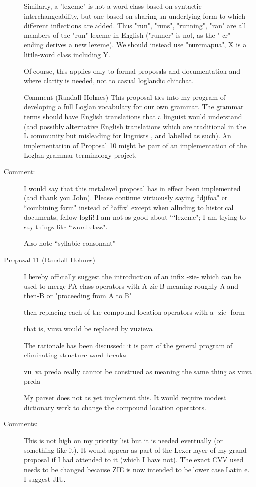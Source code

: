 \documentclass[12pt]{article}
\begin{document}
\begin{description}
Similarly, a "lexeme" is not
 a word class based on syntactic
interchangeability, but one based 
on sharing an underlying form to which
different inflections are added.  
Thus "run", "runs", "running", "ran"
are all members of the "run" lexeme 
in English ("runner" is not, as the
"-er" ending derives a new lexeme). 
 We should instead use "nurcmapua",
X is a little-word class including Y.

Of course, this applies only
 to formal proposals and documentation and
where clarity is needed, not to casual loglandic chitchat.

Comment (Randall Holmes)  This proposal 
ties into my program of developing a full
Loglan vocabulary for our own grammar.  
The grammar terms should have English translations
that a linguist would understand (and possibly
 alternative English translations which are traditional
in the L community but misleading for linguists
, and labelled as such).  An implementation
of Proposal 10 might be part of an implementation
 of the Loglan grammar terminology project.

\item[Comment:]  I would say that this metalevel proposal has in effect been implemented (and thank you John).  Please continue 
virtuously saying ``djifoa" or ``combining form" instead of ``affix" except when alluding to historical documents,
fellow logli!   I am not as good about ```lexeme"; I am trying to say things like ``word class".

Also note ``syllabic consonant"


\item[Proposal 11 (Randall Holmes):]

I hereby officially suggest the introduction of an infix -zie-
which can be used to merge PA class operators with 
A-zie-B meaning roughly A-and then-B  or "proceeding from A to B"

then replacing each of the compound location operators with
a -zie- form

that is, vuva would be replaced by vuzieva

The rationale has been discussed:  it is part of the general program
of eliminating structure word breaks.

vu, va preda really cannot be construed as meaning the same thing as
vuva preda

My parser does not as yet implement this.  
It would require modest dictionary work 
to change the compound location operators.

\item[Comments:]  This is not high on my priority list but it is needed eventually (or something like it).   It would appear as part of the Lexer layer of my grand proposal if I had attended to it (which I have not).
The exact CVV used needs to be changed because ZIE is now intended to be lower case Latin e.  I suggest JIU.


\end{description}
\end{document}
